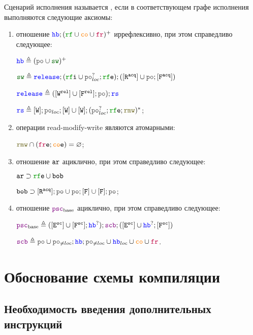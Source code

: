 \begin{defn}\label{def:imm-consistent}
  Сценарий исполнения называется , если в соответствующем графе исполнения выполняются следующие аксиомы:
  \begin{enumerate}
  \item отношение $\lHB ; (\lRF \cup \lCO \cup \lFR)^{+}$ иррефлексивно, при этом справедливо следующее:
    
  $\lHB \defeq (\lPO \cup \lSW)^{+}$

  $\lSW \defeq \mathtt{\color{blue}release};(\lRFI \cup \lPO^?_{loc};\lRFE);([\lR^{\acq}] \cup \lPO;[\lF^{\acq}])$

  $\mathtt{\color{blue}release} \defeq ([\lW^{\rel}] \cup [\lF^{\rel}];\lPO);\mathtt{\color{blue}rs}$

  $\mathtt{\color{blue}rs} \defeq [\lW];\lPO_{loc};[\lW] \cup [\lW];(\lPO^?_{loc};\lRFE;\lRMW)^{*}$;
\item операции read-modify-write являются атомарными:

  $\lRMW \cap (\lFRE ; \lCOE) = \emptyset$;
  \item отношение $\lAR$ ациклично, при этом справедливо следующее:

    $\lAR \supset \lRFE \cup \lBOB$

    $\lBOB \supset [\lR^{\acq}] ; \lPO \cup \lPO ; [\lF] \cup [\lF] ; \lPO$;
  \item отношение $\lPSCB$ ациклично, при этом справедливо следующее:

    $\lPSCB \defeq ([\lE^\sco] \cup{} [\lF^\sco];\lHB^?);\lSCB;([\lE^\sco] \cup{} \lHB^?;[\lF^\sco])$

    $\lSCB \defeq \lPO \cup \lPO_{\neq loc} ; \lHB ; \lPO_{\neq loc} \cup \lHB_{loc} \cup \lCO \cup \lFR$.

  \end{enumerate}
\end{defn}


\section{Обоснование схемы компиляции}
\label{compilation-scheme}

\subsection{Необходимость введения дополнительных инструкций}
\label{extra-instrs}

